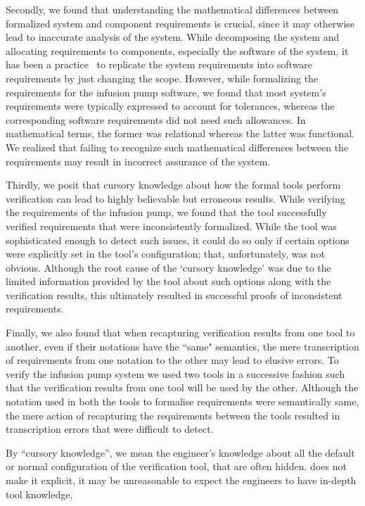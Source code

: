 Secondly, we found that understanding the mathematical differences between formalized system and component requirements is crucial, since it may otherwise lead to inaccurate analysis of the system. While decomposing the system and allocating requirements to components, especially the software of the system, it has been a practice~\cite{extending4variabe} to replicate the system requirements into software requirements by just changing the scope. However, while formalizing the requirements for the infusion pump software, we found that most system's requirements were typically expressed to account for tolerances, whereas the corresponding software requirements did not need such allowances. In mathematical terms, the former was relational whereas the latter was functional. We realized that failing to recognize such mathematical differences between the requirements may result in incorrect assurance of the system. %

Thirdly, we posit that cursory knowledge about how the formal tools perform  verification can lead to highly believable but erroneous results. While verifying the requirements of the infusion pump, we found that the tool successfully verified requirements that were inconsistently formalized. While the tool was sophisticated enough to detect such issues, it could do so only if certain options were explicitly set in the tool's configuration; that, unfortunately, was not obvious. Although the root cause of the `cursory knowledge' was due to the limited information provided by the tool about such options along with the verification results, this ultimately resulted in successful proofs of inconsistent requirements.

Finally, we also found that when recapturing verification results from one tool to another, even if their notations have the ``same" semantics, the mere transcription of requirements from one notation to the other may lead to elusive errors. To verify the infusion pump system we used two tools in a successive fashion such that the verification results from one tool will be used by the other. Although the notation used in both the tools to formalise requirements were semantically same, the mere action of recapturing the requirements between the tools resulted in transcription errors that were difficult to detect.

By ``cursory knowledge'', we mean the engineer's knowledge about all the default or normal configuration of the verification tool, that are often hidden. does not make it explicit, it may be unreasonable to expect the engineers to have in-depth tool knowledge,   %


